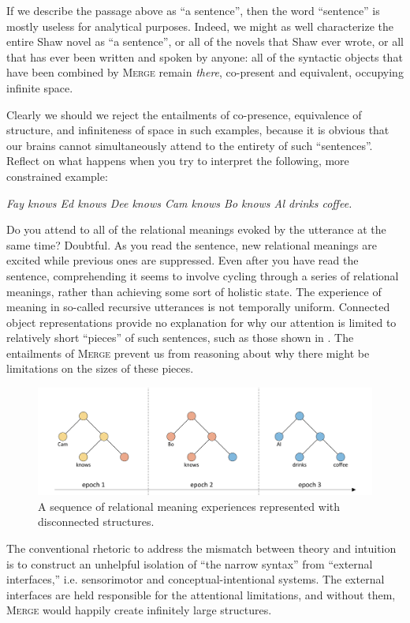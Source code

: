  If we describe the passage above as “a sentence”, then the word “sentence” is mostly useless for analytical purposes. Indeed, we might as well characterize the entire Shaw novel as “a sentence”, or all of the novels that Shaw ever wrote, or all that has ever been written and spoken by anyone: all of the syntactic objects that have been combined by \textsc{Merge} remain \textit{there}, co-present and equivalent, occupying infinite space. 

  Clearly we should we reject the entailments of co-presence, equivalence of structure, and infiniteness of space in such examples, because it is obvious that our brains cannot simultaneously attend to the entirety of such “sentences”. Reflect on what happens when you try to interpret the following, more constrained example:

\ea
\textit{Fay knows Ed knows Dee knows Cam knows Bo knows Al drinks coffee.}
\z

  Do you attend to all of the relational meanings evoked by the utterance at the same time? Doubtful. As you read the sentence, new relational meanings are excited while previous ones are suppressed. Even after you have read the sentence, comprehending it seems to involve cycling through a series of relational meanings, rather than achieving some sort of holistic state. The experience of meaning in so-called recursive utterances is not temporally uniform. Connected object representations provide no explanation for why our attention is limited to relatively short “pieces” of such sentences, such as those shown in {}. The entailments of \textsc{Merge} prevent us from reasoning about why there might be limitations on the sizes of these pieces.

  
\begin{figure}
\includegraphics[width=\textwidth]{figures/Tilsen-img111.png}
\caption{A sequence of relational meaning experiences represented with disconnected structures.}
\label{fig:5:7}
\end{figure}
 

  The conventional rhetoric to address the mismatch between theory and intuition is to construct an unhelpful isolation of “the narrow syntax” from “external interfaces,” i.e. sensorimotor and conceptual-intentional systems. The external interfaces are held responsible for the attentional limitations, and without them, \textsc{Merge} would happily create infinitely large structures. 

